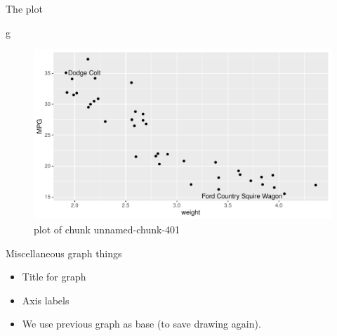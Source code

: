 \documentclass[ignorenonframetext,]{beamer}
\newenvironment{Shaded}{\begin{snugshade}}{\end{snugshade}}
\newcommand{\NormalTok}[1]{#1}
\providecommand{\tightlist}{%
  \setlength{\itemsep}{0pt}\setlength{\parskip}{0pt}}
\begin{document}
\begin{frame}[fragile]{The plot}
\protect\hypertarget{the-plot-7}{}

\begin{Shaded}
\begin{Highlighting}[]
\NormalTok{g}
\end{Highlighting}
\end{Shaded}

\begin{figure}
\centering
\includegraphics{figure/unnamed-chunk-401-1.pdf}
\caption{plot of chunk unnamed-chunk-401}
\end{figure}

\end{frame}

\begin{frame}{Miscellaneous graph things}
\protect\hypertarget{miscellaneous-graph-things}{}

\begin{itemize}
\tightlist
\item
  Title for graph
\item
  Axis labels
\item
  We use previous graph as base (to save drawing again).
\end{itemize}

\end{frame}
\end{document}
